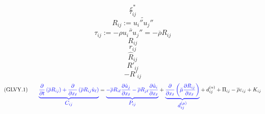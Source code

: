 \documentclass{article}
\begin{document}
\begin{equation}
\varepsilon^*
\end{equation}
\begin{equation}
\tau_{ij}
\end{equation}
\begin{equation}
R_{ij}:=\widetilde{u_i''u_j''}
\end{equation}
\begin{equation}
\tau_{ij}:=-\overline{\rho u_i''u_j''}=-\overline{\rho}R_{ij}%
\end{equation}
\begin{equation}
R_{ij}
\end{equation}
\begin{equation}
r_{ij}
\end{equation}
\begin{equation}
\hat R_{ij}
\end{equation}
\begin{equation}
R'_{ij}
\end{equation}
\begin{equation}
-R'_{ij}
\end{equation}
\begin{equation}
({\rm GLVY}.1)\qquad
{\color{blue}{\underbrace{\frac{\partial}{\partial t}\left(\overline{\rho}R_{ij}\right)
+\frac{\partial}{\partial x_\ell}\left(\overline{\rho}R_{ij}\hat{u}_\ell\right)}_{\displaystyle C_{ij}}}}=
{\color{blue}{\underbrace{-\overline{\rho}R_{i\ell}\frac{\partial \hat{u}_j}{\partial x_\ell}
                          -\overline{\rho}R_{j\ell}\frac{\partial \hat{u}_i}{\partial x_\ell}}_{\displaystyle P_{ij}}}}+
{\color{blue}{\underbrace{\frac{\partial}{\partial x_\ell}\left(\breve{\mu}\frac{\partial R_{ij}}{\partial x_\ell}\right)}_{\displaystyle d_{ij}^{(\mu)}}}}
+d_{ij}^{(u)}+\Pi_{ij}-\overline{\rho}\varepsilon_{ij}+K_{ij}
\end{equation}
\end{document}
